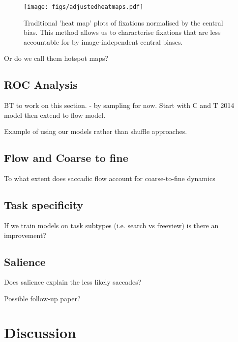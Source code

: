 \documentclass[a4paper, onecolumn, oneside, 11pt]{article}
\begin{document}
\begin{figure}
\texttt{[image: figs/adjustedheatmaps.pdf]}
\caption{Traditional 'heat map' plots of fixations normalised by the central bias. This method allows us to characterise fixations that are less accountable for by image-independent central biases.}
\label{fig:adjustedHeatmaps}
\end{figure}

Or do we call them hotspot maps?

\subsection{ROC Analysis}

BT to work on this section.
 - by sampling for now. Start with C and T 2014 model then extend to flow model.

Example of using our models rather than shuffle approaches.

\subsection{Flow and Coarse to fine}
To what extent does saccadic flow account for coarse-to-fine dynamics

\subsection{Task specificity}

If we train models on task subtypes (i.e. search vs freeview) is there an improvement?

\subsection{Salience}

Does salience explain the less likely saccades? 

Possible follow-up paper?

\section{Discussion}

\cite{}
\end{document}

